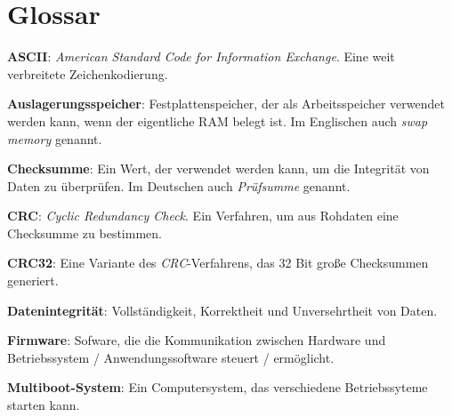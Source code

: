\section{Glossar}

\textbf{ASCII}:
\textit{American Standard Code for Information Exchange}. Eine weit verbreitete Zeichenkodierung.

\textbf{Auslagerungsspeicher}:
Festplattenspeicher, der als Arbeitsspeicher verwendet werden kann, wenn der eigentliche RAM belegt ist.
Im Englischen auch \textit{swap memory} genannt.

\textbf{Checksumme}:
Ein Wert, der verwendet werden kann, um die Integrität von Daten zu überprüfen.
Im Deutschen auch \textit{Prüfsumme} genannt.

\textbf{CRC}:
\textit{Cyclic Redundancy Check}.
Ein Verfahren, um aus Rohdaten eine Checksumme zu bestimmen.

\textbf{CRC32}:
Eine Variante des \textit{CRC}-Verfahrens, das 32 Bit große Checksummen generiert.

\textbf{Datenintegrität}:
Vollständigkeit, Korrektheit und Unversehrtheit von Daten. 

\textbf{Firmware}:
Sofware, die die Kommunikation zwischen Hardware und Betriebssystem / Anwendungssoftware steuert / ermöglicht.

\textbf{Multiboot-System}:
Ein Computersystem, das verschiedene Betriebssyteme starten kann.
